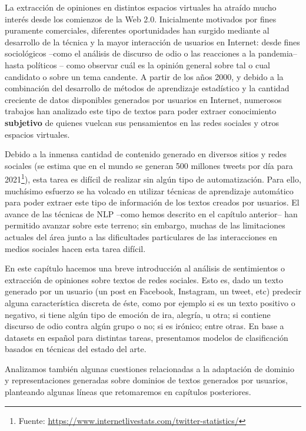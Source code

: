 \label{chap:03_social_text_classification}

La extracción de opiniones en distintos espacios virtuales ha atraído mucho interés desde los comienzos de la Web 2.0. Inicialmente motivados por fines puramente comerciales, diferentes oportunidades han surgido mediante al desarrollo de la técnica y la mayor interacción de usuarios en Internet: desde fines sociológicos --como el análisis de discurso de odio o las reacciones a la pandemia-- hasta políticos -- como observar cuál es la opinión general sobre tal o cual candidato o sobre un tema candente. A partir de los años 2000, y debido a la combinación del desarrollo de métodos de aprendizaje estadístico y la cantidad creciente de datos disponibles generados por usuarios en Internet, numerosos trabajos han analizado este tipo de textos para poder extraer conocimiento \textbf{subjetivo} de quienes vuelcan sus pensamientos en las redes sociales y otros espacios virtuales.

Debido a la inmensa cantidad de contenido generado en diversos sitios y redes sociales (se estima que en el mundo se generan 500 millones tweets por día para 2021\footnote{Fuente: \url{https://www.internetlivestats.com/twitter-statistics/}}), esta tarea es difícil de realizar sin algún tipo de automatización. Para ello, muchísimo esfuerzo se ha volcado en utilizar técnicas de aprendizaje automático para poder extraer este tipo de información de los textos creados por usuarios. El avance de las técnicas de NLP --como hemos descrito en el capítulo anterior-- han permitido avanzar sobre este terreno; sin embargo, muchas de las limitaciones actuales del área junto a las dificultades particulares de las interacciones en medios sociales hacen esta tarea difícil.

En este capítulo hacemos una breve introducción al análisis de sentimientos o extracción de opiniones sobre textos de redes sociales. Esto es, dado un texto generado por un usuario (un post en Facebook, Instagram, un tweet, etc) predecir alguna característica discreta de éste, como por ejemplo si es un texto positivo o negativo, si tiene algún tipo de emoción de ira, alegría, u otra; si contiene discurso de odio contra algún grupo o no; si es irónico; entre otras. En base a datasets en español para distintas tareas, presentamos modelos de clasificación basados en técnicas del estado del arte.

Analizamos también algunas cuestiones relacionadas a la adaptación de dominio y representaciones generadas sobre dominios de textos generados por usuarios, planteando algunas líneas que retomaremos en capítulos posteriores.


